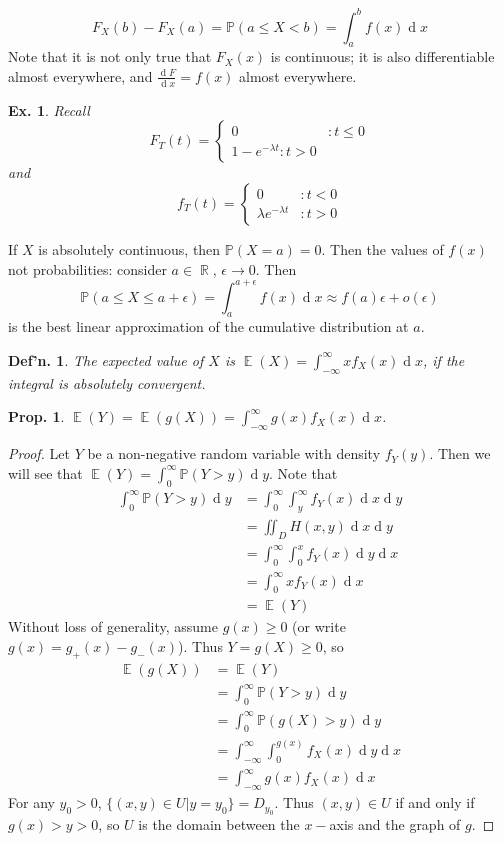 \documentclass[12pt, a4paper]{book}
\DeclareMathOperator{\R}{\mathbb{R}}
\DeclareMathOperator{\E}{\mathbb{E}}
\renewcommand{\Pr}{\mathbb{P}}
\renewcommand{\d}[1]{\ensuremath{\operatorname{d}\!{#1}}} %
\newtheorem{definition}[theorem]{Def'n.}
\newtheorem{proposition}[theorem]{Prop.}
\newtheorem{example}[theorem]{Ex.}
\theoremstyle{nonumberplain}
\newtheorem{proof}{Proof}
\begin{document}
\[F_X(b)-F_X(a)=\Pr(a\leq X<b)=\int_a^b f(x)\d{x}\]
Note that it is not only true that $F_X(x)$ is continuous; it is also differentiable almost everywhere, and $\frac{\d{F}}{\d{x}}=f(x)$ almost everywhere.
\begin{example}
    Recall
    \[F_T(t)=
        \begin{cases}
            0 &: t\leq 0\\
            1-e^{-\lambda t}: t>0
        \end{cases}
    \]
    and
    \[f_T(t)=
        \begin{cases}
            0 &: t<0\\
            \lambda e^{-\lambda t} &:t >0
        \end{cases}
    \]
\end{example}
If $X$ is absolutely continuous, then $\Pr(X=a)=0$.
Then the values of $f(x)$ not probabilities: consider $a\in\R$, $\epsilon\to 0$.
Then
\[\Pr(a\leq X\leq a+\epsilon)=\int_a^{a+\epsilon}f(x)\d{x}\approx f(a)\epsilon+o(\epsilon)\]
is the best linear approximation of the cumulative distribution at $a$.
\begin{definition}
    The expected value of $X$ is $\E(X)=\int_{-\infty}^\infty xf_X(x)\d{x}$, if the integral is absolutely convergent.
\end{definition}
\begin{proposition}
    $\E(Y)=\E(g(X))=\int_{-\infty}^\infty g(x)f_X(x)\d{x}$.
\end{proposition}
\begin{proof}
    Let $Y$ be a non-negative random variable with density $f_Y(y)$.
    Then we will see that $\E(Y)=\int_0^{\infty}\Pr(Y>y)\d{y}$.
    Note that
    \begin{align*}
        \int_0^\infty \Pr(Y>y)\d{y}&=\int_0^\infty \int_y^\infty f_Y(x)\d{x}\d{y}\\
                                   &=\iint_D H(x,y)\d{x}\d{y}\\
                                   &= \int_0^\infty\int_0^x f_Y(x)\d{y}\d{x}\\
                                   &= \int_0^\infty x f_Y(x)\d{x}\\
                                   &= \E(Y)
    \end{align*}
    Without loss of generality, assume $g(x)\geq 0$ (or write $g(x)=g_+(x)-g_-(x)$).
    Thus $Y=g(X)\geq 0$, so
    \begin{align*}
        \E(g(X)) &= \E(Y)\\
                 &= \int_0^\infty \Pr(Y>y)\d{y}\\
                 &= \int_0^\infty \Pr(g(X)>y)\d{y}\\
                 &= \int_{-\infty}^\infty \int_0^{g(x)}f_X(x)\d{y}\d{x}\\
                 &= \int_{-\infty}^\infty g(x)f_X(x)\d{x}
    \end{align*}
    For any $y_0>0$, $\{(x,y)\in U|y=y_0\}=D_{y_0}$.
    Thus $(x,y)\in U$ if and only if $g(x)>y>0$, so $U$ is the domain between the $x-$axis and the graph of $g$.
\end{proof}
\end{document}
